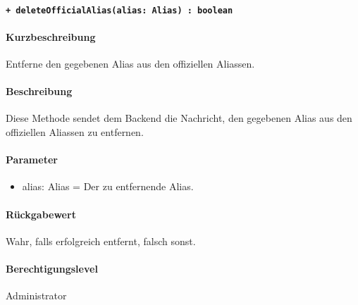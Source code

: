 \paragraph{\texttt{+ deleteOfficialAlias(alias: Alias) : boolean}}\label{AP_Framework_deleteOfficialAlias}%
\paragraph*{Kurzbeschreibung}
Entferne den gegebenen Alias aus den offiziellen Aliassen.
\paragraph*{Beschreibung}
Diese Methode sendet dem Backend die Nachricht, den gegebenen Alias aus den offiziellen Aliassen zu entfernen.
\paragraph*{Parameter}
\begin{itemize}
    \item alias: Alias = Der zu entfernende Alias.
\end{itemize}
\paragraph*{Rückgabewert}
Wahr, falls erfolgreich entfernt, falsch sonst.
\paragraph*{Berechtigungslevel}
Administrator